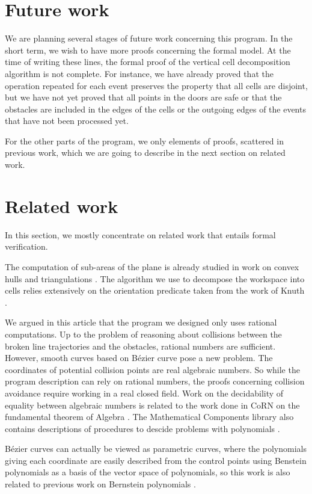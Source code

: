 \documentclass{easychair}
\begin{document}
\section{Future work}
We are planning several stages of future work concerning this program.  In
the short term, we wish to have more proofs concerning the formal model.
At the time of writing these lines, the formal proof of the vertical cell
decomposition algorithm is not complete.  For instance, we have already
proved that the operation repeated for each event preserves the property that
all cells are disjoint, but we have not yet proved that all points in
the doors are safe or that the obstacles are included in the edges of the
cells or the outgoing edges of the events that have not been processed yet.

For the other parts of the program, we only elements of proofs, scattered in
previous work, which we are going to describe in the next section on related
work.
\section{Related work}
In this section, we mostly concentrate on related work that entails formal
verification.

The computation of sub-areas of the plane is already studied in work
on convex hulls \cite{PichardieBertot01} and triangulations
\cite{DufourdBertot10,Bertot18}.  The algorithm we use to decompose
the workspace into cells relies extensively on the orientation
predicate taken from the work of Knuth \cite{KnuthAxiomsAndHulls}.

We argued in this article that the program we designed only uses
rational computations.  Up to the problem of reasoning about
collisions between the broken line trajectories and the obstacles,
rational numbers are sufficient.  However, smooth curves based on
Bézier curve pose a new problem.  The coordinates of potential
collision points are real algebraic numbers.  So while the program
description can rely on rational numbers, the proofs concerning
collision avoidance require working in a real closed field.  Work on
the decidability of equality between algebraic numbers is related to
the work done in CoRN on the fundamental theorem of Algebra
\cite{GeuversWZ00}.  The Mathematical Components library also contains
descriptions of procedures to descide problems with polynomials
\cite{CohenMQERCF}.

Bézier curves can actually be viewed as parametric curves, where the
polynomials giving each coordinate are easily described from the
control points using Benstein polynomials as a basis of the vector
space of polynomials, so this work is also related to previous work on
Bernstein polynomials \cite{BertotMahboubiGuilhot}.
\end{document}
